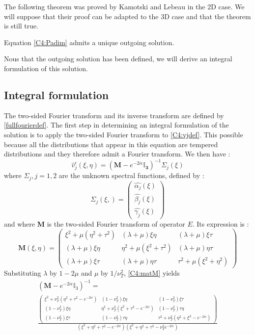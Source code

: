 The following theorem was proved by Kamotski and Lebeau \cite{KamotskiLebeau} in the 2D case. We will suppose that their proof can be adapted to the 3D case and that the theorem is still true.
\begin{theorem}
Equation \eqref{C4:Padim} admits a unique outgoing solution.
\end{theorem}
Nous that the outgoing solution has been defined, we will derive an integral formulation of this solution.

\subsection{Integral formulation}
The two-sided Fourier transform and its inverse transform are defined by \eqref{fullfourierdef}. The first step in determining an integral formulation of the solution is to apply the two-sided Fourier transform to \eqref{C4:vjdef}. This possible because all the distributions that appear in this equation are tempered distributions and they therefore admit a Fourier transform. We then have :
\begin{equation}
\hat{v}^{\epsilon}_j(\xi,\eta)=(\mathbf{M}-e^{-2i\epsilon}\mathbf{\mathbb{I}_3})^{-1}\Sigma_j(\xi)
\label{C4:matMvjeps}
\end{equation}
where $\Sigma_j, j=1,2$  are the unknown spectral functions, defined by :
\begin{equation}
\Sigma_j(\xi,)=\begin{pmatrix}
\hat{\alpha_j}(\xi)\\ \hat{\beta_j}(\xi) \\ \hat{\gamma_j}(\xi)
\end{pmatrix}
\end{equation}
and where \textbf{M} is the two-sided Fourier transform of operator $E$. Its expression is :
\begin{equation}
\mathbf{M}(\xi,\eta)=
\begin{pmatrix}
\xi^2+\mu(\eta^2+\tau^2) & (\lambda+\mu)\xi \eta & (\lambda+\mu)\xi\tau \\
 (\lambda+\mu)\xi \eta & \eta^2+\mu(\xi^2+\tau^2) & (\lambda+\mu)\eta\tau \\
(\lambda+\mu)\xi\tau & (\lambda+\mu)\eta\tau & \tau^2+\mu(\xi^2+\eta^2) 
\end{pmatrix}
\label{C4:matM}
\end{equation}
Substituting $\lambda$ by $1-2\mu$ and $\mu$ by $1/\nu_T^2$, \eqref{C4:matM} yields
\begin{multline}
(\mathbf{M}-e^{-2i\epsilon}\mathbb{I}_3)^{-1}=\\
\frac{\begin{pmatrix}
\xi^2+\nu_T^2(\eta^2+\tau^2-e^{-2i\epsilon}) & (1-\nu_T^2)\xi \eta & (1-\nu_T^2)\xi \tau \\
(1-\nu_T^2)\xi \eta & \eta^2+\nu_T^2(\xi^2+\tau^2-e^{-2i\epsilon}) & (1-\nu_T^2)\tau \eta \\
(1-\nu_T^2)\xi \tau & (1-\nu_T^2)\tau \eta & \tau^2+\nu_T^2(\eta^2+\xi^2-e^{-2i\epsilon})
\end{pmatrix}}{(\xi^2+\eta^2+\tau^2-e^{-2i\epsilon})(\xi^2+\eta^2+\tau^2-\nu_T^2e^{-2i\epsilon})} 
\end{multline}

